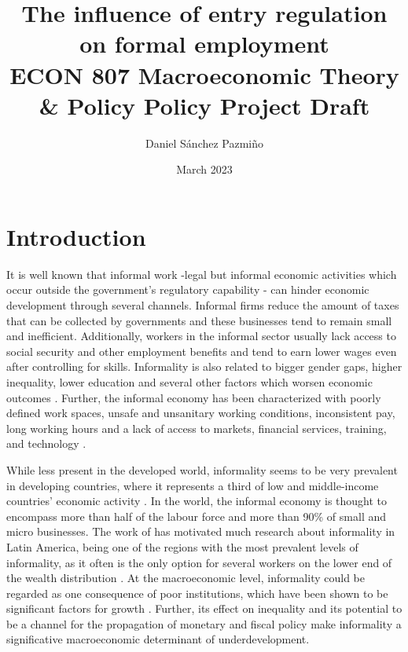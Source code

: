 \documentclass[12pt,a4paper]{article}\usepackage[]{graphicx}\usepackage[]{xcolor}
\title{The influence of entry regulation on formal employment \\[1em] 
\large{ECON 807 Macroeconomic Theory \& Policy Policy Project Draft}}
\author{Daniel Sánchez Pazmiño}
\date{March 2023}
\begin{document}
\maketitle

\begin{abstract}

\lipsum[1]

\end{abstract}

\section{Introduction}

It is well known that informal work -legal but informal economic activities which occur outside the government's regulatory capability \parencite{Sassen.1994} - can hinder economic development through several channels. Informal firms reduce the amount of taxes that can be collected by governments and these businesses tend to remain small and inefficient. Additionally, workers in the informal sector usually lack access to social security and other employment benefits and tend to earn lower wages even after controlling for skills. Informality is also related to bigger gender gaps, higher inequality, lower education and several other factors which worsen economic outcomes \parencite{Delechat2020}. Further, the informal economy has been characterized with poorly defined work spaces, unsafe and unsanitary working conditions, inconsistent pay, long working hours and a lack of access to markets, financial services, training, and technology \parencite{IloND}. 

While less present in the developed world, informality seems to be very prevalent in developing countries, where it represents a third of low and middle-income countries' economic activity \parencite{Delechat2020}. In the world, the informal economy is thought to encompass more than half of the labour force and more than 90\% of small and micro businesses. The work of \textcite{Soto.2002} has motivated much research about informality in Latin America, being one of the regions with the most prevalent levels of informality, as it often is the only option for several workers on the lower end of the wealth distribution \parencite{Oviedo.2009}. At the macroeconomic level, informality could be regarded as one consequence of poor institutions, which have been shown to be significant factors for growth \parencite{Acemoglu.2001, RafaelLaPorta.1997, Glaeser.2004}. Further, its effect on inequality and its potential to be a channel for the propagation of monetary and fiscal policy \textcite{Alberola.2020} make informality a significative macroeconomic determinant of underdevelopment.
\end{document}
